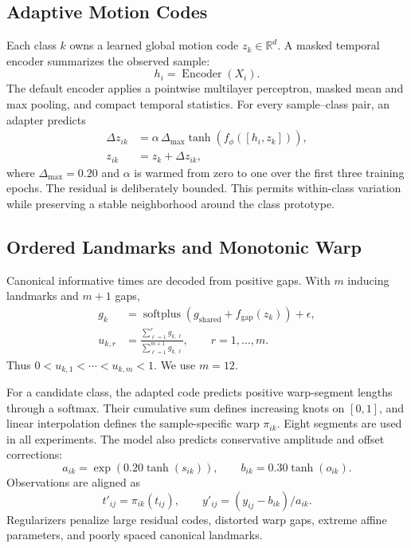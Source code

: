 \documentclass[11pt]{article}
\newcommand{\R}{\mathbb{R}}
\newcommand{\softplus}{\operatorname{softplus}}
\begin{document}
\subsection{Adaptive Motion Codes}

Each class $k$ owns a learned global motion code $z_k\in\R^d$. A masked temporal encoder summarizes the observed sample:
\begin{equation}
  h_i = \operatorname{Encoder}(X_i).
\end{equation}
The default encoder applies a pointwise multilayer perceptron, masked mean and max pooling, and compact temporal statistics. For every sample--class pair, an adapter predicts
\begin{align}
  \Delta z_{ik} &= \alpha\,\Delta_{\max}\tanh\!\left(f_\phi([h_i,z_k])\right),\\
  z_{ik} &= z_k + \Delta z_{ik},
\end{align}
where $\Delta_{\max}=0.20$ and $\alpha$ is warmed from zero to one over the first three training epochs. The residual is deliberately bounded. This permits within-class variation while preserving a stable neighborhood around the class prototype.

\subsection{Ordered Landmarks and Monotonic Warp}

Canonical informative times are decoded from positive gaps. With $m$ inducing landmarks and $m+1$ gaps,
\begin{align}
  g_k &= \softplus(g_{\mathrm{shared}} + f_{\mathrm{gap}}(z_k)) + \epsilon,\\
  u_{k,r} &= \frac{\sum_{\ell=1}^{r} g_{k,\ell}}{\sum_{\ell=1}^{m+1} g_{k,\ell}},
  \qquad r=1,\ldots,m.
\end{align}
Thus $0<u_{k,1}<\cdots<u_{k,m}<1$. We use $m=12$.

For a candidate class, the adapted code predicts positive warp-segment lengths through a softmax. Their cumulative sum defines increasing knots on $[0,1]$, and linear interpolation defines the sample-specific warp $\pi_{ik}$. Eight segments are used in all experiments. The model also predicts conservative amplitude and offset corrections:
\begin{equation}
  a_{ik}=\exp(0.20\tanh(s_{ik})), \qquad
  b_{ik}=0.30\tanh(o_{ik}).
\end{equation}
Observations are aligned as
\begin{equation}
  t'_{ij}=\pi_{ik}(t_{ij}), \qquad
  y'_{ij}=(y_{ij}-b_{ik})/a_{ik}.
\end{equation}
Regularizers penalize large residual codes, distorted warp gaps, extreme affine parameters, and poorly spaced canonical landmarks.
\end{document}
